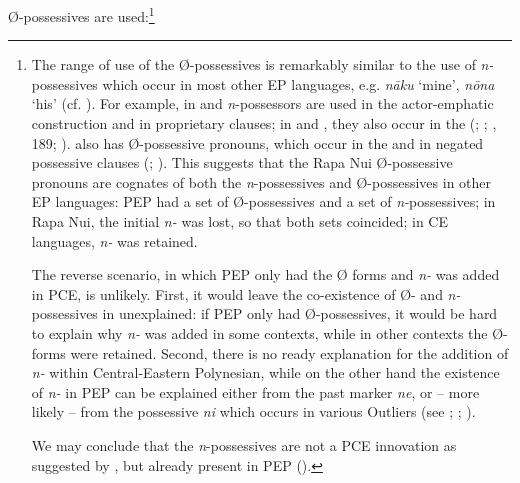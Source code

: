 Ø-possessives are used:\footnote{\label{fn:290}The range of use of the Ø-possessives is remarkably similar to the use of \textit{n-}possessives which occur in most other EP languages, e.g.  \textit{nāku} ‘mine’, \textit{nōna} ‘his’ (cf. \citealt[316]{Wilson2012}). For example, in  and  \textit{n}{}-possessors are used in the actor-emphatic construction and in proprietary clauses; in  and , they also occur in the  (\citealt[208–209]{Bauer1993}; \citealt{Harlow2000}; \citealt[175–176]{LazardPeltzer2000}, 189; \citealt[349]{Cook2000}).  also has Ø-possessive pronouns, which occur in the  and in negated possessive clauses (\citealt[202, 381]{Bauer1993}; \citealt[359]{Harlow2000}). This suggests that the Rapa Nui Ø-possessive pronouns are cognates of both the \textit{n}{}-possessives and Ø-possessives in other EP languages: PEP had a set of Ø-possessives and a set of \textit{n-}possessives; in Rapa Nui, the initial \textit{n-} was lost, so that both sets coincided; in CE languages, \textit{n-} was retained. 

The reverse scenario, in which PEP only had the Ø forms and \textit{n-} was added in PCE, is unlikely. First, it would leave the co-existence of Ø- and \textit{n-}possessives in  unexplained: if PEP only had Ø-possessives, it would be hard to explain why \textit{n-} was added in some contexts, while in other contexts the Ø-forms were retained. Second, there is no ready explanation for the addition of \textit{n-} within Central-Eastern Polynesian, while on the other hand the existence of \textit{n-} in PEP can be explained either from the past  marker \textit{ne}, or – more likely – from the possessive \textit{ni} which occurs in various Outliers (see \citealt[50]{Wilson1982}; \citealt[101]{Wilson1985}; \citealt[263]{Clark2000Possessive}).

We may conclude that the \textit{n}{}-possessives are not a PCE innovation as suggested by \citet[12]{Green1985}, but already present in PEP ().}


